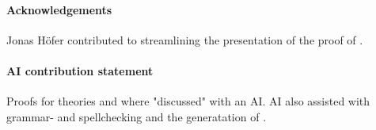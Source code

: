 \paragraph{Acknowledgements}Jonas H\"ofer contributed to streamlining the presentation of the proof of .


\paragraph{AI contribution statement} Proofs for theories  and  where "discussed" with an AI. AI also assisted with grammar- and spellchecking and the generatation of . 
